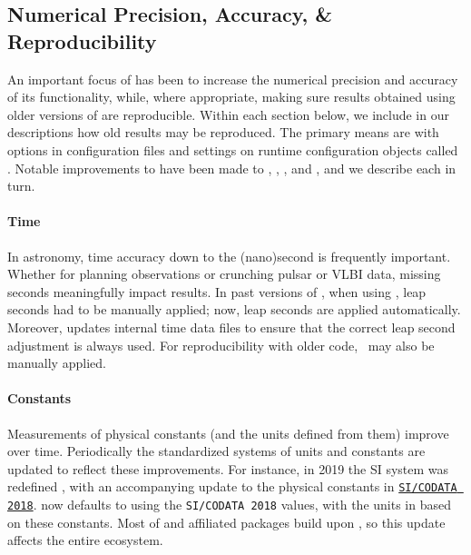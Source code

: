 \documentclass[modern]{aastex631}
\begin{document}
\subsection{Numerical Precision, Accuracy, \& Reproducibility}
\label{sec:core-features-precision_accuracy_repreducibility}

An important focus of \astropypkg has been to increase the numerical precision and accuracy
of its functionality, while, where appropriate, making sure results obtained
using older versions of \astropypkg are reproducible. Within each section below,
we include in our descriptions how old results may be reproduced. The primary
means are with options in configuration files and settings on runtime configuration
objects called \astropyScienceState. Notable improvements to \astropypkg have
been made to \astropytime, \astropyconstants, \astropycoordinates, and
\astropycosmology, and we describe each in turn.

\paragraph{Time}
In astronomy, time accuracy down to the (nano)second is frequently important.
Whether for planning observations or crunching pulsar or VLBI data, missing
seconds meaningfully impact results. In past versions of \astropypkg, when using
\astropyTime, leap seconds had to be manually applied; now, leap
seconds are applied automatically. Moreover, \astropypkg updates internal time
data files to ensure that the correct leap second adjustment is always used. For
reproducibility with older code, \astropyLeapSeconds\ may also be
manually applied.

\paragraph{Constants}

Measurements of physical constants (and the units defined from them) improve
over time. Periodically the standardized systems of units and constants are
updated to reflect these improvements. For instance, in 2019 the SI system was
redefined \citep{NIST2019}, with an accompanying update to the physical
constants in
\href{https://codata.org/initiatives/data-science-and-stewardship/fundamental-physical-constants/}{\texttt{SI/CODATA
2018}}. \astropyconstants now defaults to using the \texttt{SI/CODATA 2018}
values, with the units in \astropyunits based on these constants. Most of
\astropy and affiliated packages build upon \astropyunits, so this update
affects the entire \astropy ecosystem.
\end{document}
